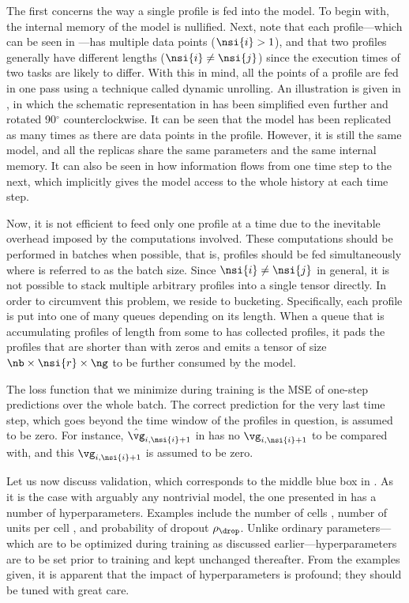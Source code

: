 The first concerns the way a single profile is fed into the model. To begin
with, the internal memory of the model is nullified. Next, note that each
profile---which can be seen in ---has multiple data points
($\nsi{i} > 1$), and that two profiles generally have different lengths
($\nsi{i} \neq \nsi{j}$) since the execution times of two tasks are likely to
differ. With this in mind, all the points of a profile are fed in one pass using
a technique called dynamic unrolling. An illustration is given in
, in which the schematic representation in 
has been simplified even further and rotated 90${}^\circ$ counterclockwise. It
can be seen that the model has been replicated as many times as there are data
points in the profile. However, it is still the same model, and all the replicas
share the same parameters and the same internal memory. It can also be seen in
 how information flows from one time step to the next, which
implicitly gives the model access to the whole history at each time step.

Now, it is not efficient to feed only one profile at a time due to the
inevitable overhead imposed by the computations involved. These computations
should be performed in batches when possible, that is, \nb profiles should be
fed simultaneously where \nb is referred to as the batch size. Since $\nsi{i}
\neq \nsi{j}$ in general, it is not possible to stack multiple arbitrary
profiles into a single tensor directly. In order to circumvent this problem, we
reside to bucketing. Specifically, each profile is put into one of many queues
depending on its length. When a queue that is accumulating profiles of length
from some  to  has collected \nb profiles, it pads the profiles
that are shorter than  with zeros and emits a tensor of size $\nb \times
\nsi{r} \times \ng$ to be further consumed by the model.

The loss function that we minimize during training is the \ac{MSE} of one-step
predictions over the whole batch. The correct prediction for the very last time
step, which goes beyond the time window of the profiles in question, is assumed
to be zero. For instance, $\hat{\vg}_{i, \nsi{i} + 1}$ in  has
no $\vg_{i, \nsi{i} + 1}$ to be compared with, and this $\vg_{i, \nsi{i} + 1}$
is assumed to be zero.

Let us now discuss validation, which corresponds to the middle blue box in
. As it is the case with arguably any nontrivial model, the
one presented in  has a number of hyperparameters. Examples
include the number of cells \nc, number of units per cell \nu, and probability
of dropout $\rho_\drop$. Unlike ordinary parameters---which are to be optimized
during training as discussed earlier---hyperparameters are to be set prior to
training and kept unchanged thereafter. From the examples given, it is apparent
that the impact of hyperparameters is profound; they should be tuned with great
care.

